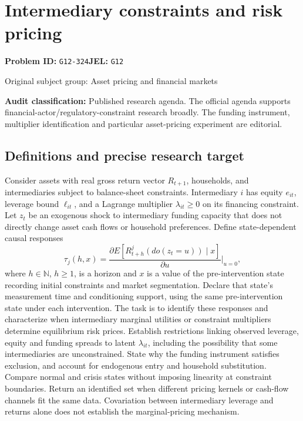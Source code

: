 \documentclass[11pt,a4paper]{article}
\newcommand{\N}{\mathbb N}
\begin{document}
\section*{Intermediary constraints and risk pricing}
\textbf{Problem ID:} \texttt{G12-324}\quad \textbf{JEL:} \texttt{G12}\par
\label{problem:OP-0316}
{\sffamily\small\color{muted}Original subject group: Asset pricing and financial markets\par}
\label{definitions:problem:30007598}
\textbf{Audit classification:} Published research agenda. The official agenda supports financial-actor/regulatory-constraint research broadly. The funding instrument, multiplier identification and particular asset-pricing experiment are editorial.
\subsection*{Definitions and precise research target}
Consider assets with real gross return vector \(R_{t+1}\), households, and intermediaries subject to balance-sheet constraints. Intermediary \(i\) has equity \(e_{it}\), leverage bound \(\ell_{it}\), and a Lagrange multiplier \(\lambda_{it}\geq0\) on its financing constraint. Let \(z_t\) be an exogenous shock to intermediary funding capacity that does not directly change asset cash flows or household preferences. Define state-dependent causal responses
\[\tau_j(h,x)=\frac{\partial E[R^j_{t+h}(do(z_t=u))\mid x]}{\partial u}\Big|_{u=0},\]
where \(h\in\N\), \(h\geq1\), is a horizon and \(x\) is a value of the pre-intervention state recording initial constraints and market segmentation. Declare that state's measurement time and conditioning support, using the same pre-intervention state under each intervention. The task is to identify these responses and characterize when intermediary marginal utilities or constraint multipliers determine equilibrium risk prices. Establish restrictions linking observed leverage, equity and funding spreads to latent \(\lambda_{it}\), including the possibility that some intermediaries are unconstrained. State why the funding instrument satisfies exclusion, and account for endogenous entry and household substitution. Compare normal and crisis states without imposing linearity at constraint boundaries. Return an identified set when different pricing kernels or cash-flow channels fit the same data. Covariation between intermediary leverage and returns alone does not establish the marginal-pricing mechanism.
\end{document}
